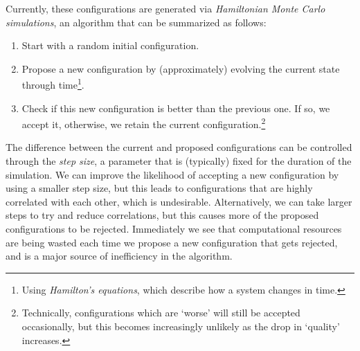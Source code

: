 \begin{doublespace}
%
Currently, these configurations are generated via \emph{Hamiltonian Monte Carlo
simulations}, an algorithm that can be summarized as follows:
%
\begin{enumerate}
  \item Start with a random initial configuration.
  \item Propose a new configuration by (approximately) evolving the current
    state through time\footnote{Using \emph{Hamilton's equations}, which
    describe how a system changes in time.}.
  \item Check if this new configuration is better than the previous one. If so,
    we accept it, otherwise, we retain the current
    configuration.\footnote{Technically, configurations which are `worse' will
      still be accepted occasionally, but this becomes increasingly
    unlikely as the drop in `quality' increases.}
\end{enumerate}
%
The difference between the current and proposed configurations can be
controlled through the \emph{step size}, a parameter that is (typically) fixed
for the duration of the simulation.
%
We can improve the likelihood of accepting a new configuration by using a
smaller step size, but this leads to configurations that are highly correlated
with each other, which is undesirable.
%
Alternatively, we can take larger steps to try and reduce correlations, but
this causes more of the proposed configurations to be rejected.
%
Immediately we see that computational resources are being wasted each time we
propose a new configuration that gets rejected, and is a major source of
inefficiency in the algorithm.


\end{doublespace}

